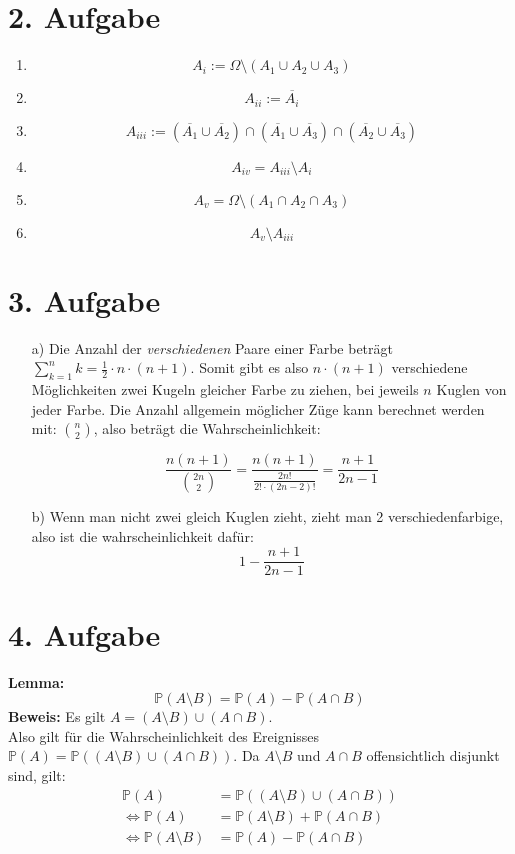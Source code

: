 \documentclass[10pt,a4paper,parskip=half]{scrartcl}
\newcommand{\PP}{\mathbb{P}}
\begin{document}
\section*{2. Aufgabe}
\begin{enumerate}[\quad(i)]
	\item $$ A_i :=  \Omega \setminus (A_1 \cup A_2 \cup A_3)$$
	\item $$ A_{ii} := \overline{A_i} $$
	\item $$ A_{iii} :=  (\overline{A_1} \cup \overline{A_2}) \cap (\overline{A_1} \cup \overline{A_3}) \cap (\overline{A_2} \cup \overline{A_3}) $$
	\item $$A_{iv} = A_{iii} \setminus  A_i $$
	\item $$ A_{v} = \Omega \setminus (A_1 \cap A_2 \cap A_3) $$
	\item $$ A_v \setminus A_{iii} $$
\end{enumerate}
\section*{3. Aufgabe}
	\begin{enumerate}
		\item[a)] Die Anzahl der \textit{verschiedenen} Paare einer Farbe beträgt $\sum^n_{k=1} k = \frac12 \cdot n \cdot (n+1)$. 
		Somit gibt es also $n \cdot (n+1)$ verschiedene Möglichkeiten zwei Kugeln gleicher Farbe zu ziehen,
		bei jeweils $n$ Kuglen von jeder Farbe.
		Die Anzahl allgemein möglicher Züge kann berechnet werden mit: $\binom n2$,
		 also beträgt die Wahrscheinlichkeit:
		 
		 \[ \frac{n(n+1)}{\binom {2n}2} = \frac{n(n+1)}{\frac{2n!}{2! \cdot (2n - 2)!}} = \frac{n+1}{2n -1} \]
	\item[b)] Wenn man nicht zwei gleich Kuglen zieht, zieht man 2 verschiedenfarbige, also ist die wahrscheinlichkeit dafür:
	$$1 - \frac{n+1}{2n - 1} $$	
	\end{enumerate}
\section*{4. Aufgabe}
	\textbf{Lemma:} 
		$$\PP(A \setminus B) = \PP(A) - \PP(A \cap B)$$
		\textbf{Beweis:} Es gilt $A = (A \setminus B) \cup (A \cap B)$. \\
		Also gilt für die Wahrscheinlichkeit des Ereignisses $\PP(A) = \PP((A\setminus B) \cup (A \cap B))$.
		Da $A \setminus B$ und $A \cap B$ offensichtlich disjunkt sind, gilt:
		\begin{align*}
			\PP(A) &=  \PP((A\setminus B) \cup (A \cap B)) \\
			\Leftrightarrow \PP(A) &= \PP(A \setminus B) + \PP(A \cap B) \\
			\Leftrightarrow \PP(A \setminus B) &= \PP(A) - \PP(A \cap B)
		\end{align*}
		
\end{document}
